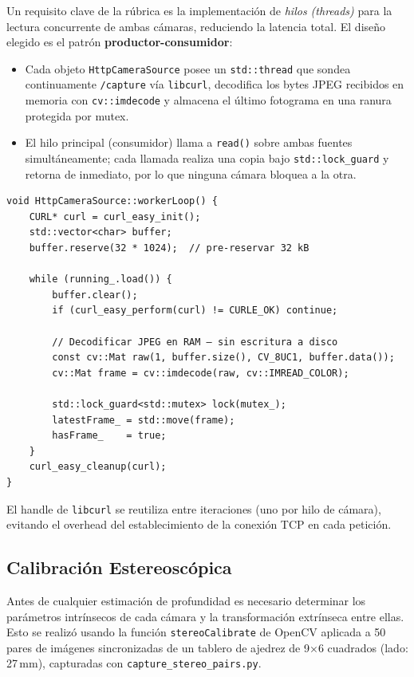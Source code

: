 \documentclass[12pt, a4paper]{article}
\begin{document}
Un requisito clave de la rúbrica es la implementación de \emph{hilos (threads)} para
la lectura concurrente de ambas cámaras, reduciendo la latencia total. El diseño
elegido es el patrón \textbf{productor-consumidor}:

\begin{itemize}[leftmargin=2em]
  \item Cada objeto \texttt{HttpCameraSource} posee un \texttt{std::thread} que
        sondea continuamente \texttt{/capture} vía \texttt{libcurl}, decodifica los
        bytes JPEG recibidos en memoria con \texttt{cv::imdecode} y almacena el último
        fotograma en una ranura protegida por mutex.
  \item El hilo principal (consumidor) llama a \texttt{read()} sobre ambas fuentes
        simultáneamente; cada llamada realiza una copia bajo \texttt{std::lock\_guard}
        y retorna de inmediato, por lo que ninguna cámara bloquea a la otra.
\end{itemize}

\begin{lstlisting}[style=cppstyle, caption={Bucle del hilo productor en CameraSource.cpp (simplificado).}]
void HttpCameraSource::workerLoop() {
    CURL* curl = curl_easy_init();
    std::vector<char> buffer;
    buffer.reserve(32 * 1024);  // pre-reservar 32 kB

    while (running_.load()) {
        buffer.clear();
        if (curl_easy_perform(curl) != CURLE_OK) continue;

        // Decodificar JPEG en RAM — sin escritura a disco
        const cv::Mat raw(1, buffer.size(), CV_8UC1, buffer.data());
        cv::Mat frame = cv::imdecode(raw, cv::IMREAD_COLOR);

        std::lock_guard<std::mutex> lock(mutex_);
        latestFrame_ = std::move(frame);
        hasFrame_    = true;
    }
    curl_easy_cleanup(curl);
}
\end{lstlisting}

El handle de \texttt{libcurl} se reutiliza entre iteraciones (uno por hilo de cámara),
evitando el overhead del establecimiento de la conexión TCP en cada petición.

\subsection{Calibración Estereoscópica}

Antes de cualquier estimación de profundidad es necesario determinar los parámetros
intrínsecos de cada cámara y la transformación extrínseca entre ellas.
Esto se realizó usando la función \texttt{stereoCalibrate} de OpenCV aplicada a 50
pares de imágenes sincronizadas de un tablero de ajedrez de 9×6 cuadrados
(lado: 27\,mm), capturadas con \texttt{capture\_stereo\_pairs.py}.
\end{document}
